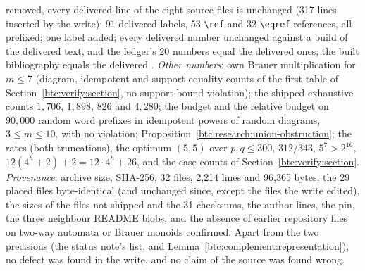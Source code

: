 \begin{writenote}
 removed, every delivered line of the eight source files is
unchanged (317 lines inserted by the write); 91 delivered labels, 53
\verb|\ref| and 32 \verb|\eqref| references, all prefixed; one label added;
every delivered number unchanged against a build of the delivered text, and
the ledger's 20 numbers equal the delivered ones; the built bibliography
equals the delivered . \emph{Other numbers}: own Brauer
multiplication for $m\le7$ (diagram, idempotent and support-equality counts
of the first table of Section~\ref{btc:verify:section}, no support-bound
violation); the shipped exhaustive counts $1{,}706$, $1{,}898$, $826$ and
$4{,}280$; the budget and the relative budget on $90{,}000$ random word
prefixes in idempotent powers of random diagrams, $3\le m\le10$, with no
violation; Proposition~\ref{btc:research:union-obstruction}; the rates (both
truncations), the optimum $(5,5)$ over $p,q\le300$, $312/343$, $5^7>2^{16}$,
$12(4^h+2)+2=12\cdot4^h+26$, and the case counts of
Section~\ref{btc:verify:section}. \emph{Provenance}: archive size, SHA-256, 32
files, 2{,}214 lines and 96{,}365 bytes, the 29 placed files byte-identical
(and unchanged since, except the files the write edited), the sizes of the
files not shipped and the 31 checksums, the author lines, the pin, the three
neighbour README blobs, and the absence of earlier repository files on
two-way automata or Brauer monoids confirmed. Apart from the two precisions
(the status note's list, and Lemma~\ref{btc:complement:representation}), no
defect was found in the write, and no claim of the source was found wrong.
\end{writenote}
